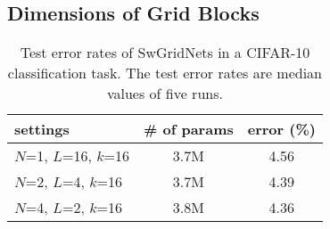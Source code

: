 \documentclass[10pt,twocolumn,letterpaper]{article}
\begin{document}
\subsection{Dimensions of Grid Blocks}

\begin{table}
\centering
 \caption{Test error rates of SwGridNets in a CIFAR-10 classification task.
 The test error rates are median values of five runs.}
 \vskip 3pt
 \label{table:result1}
 \begin{tabular}{|l|c|c|}
  \hline
  settings & \# of params & error (\%) \\
  \hline
  $N$=1, $L$=16, $k$=16 & 3.7M & 4.56 \\
  $N$=2, $L$=4, $k$=16 & 3.7M & 4.39 \\
  $N$=4, $L$=2, $k$=16 & 3.8M & 4.36 \\
  \hline
 \end{tabular}
\end{table}
\end{document}
